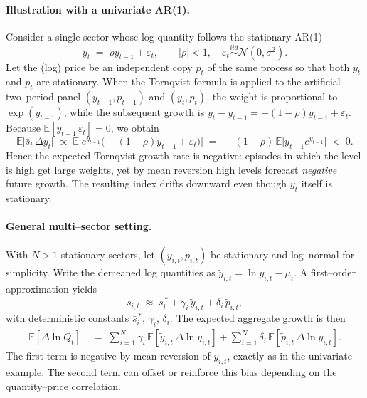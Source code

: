 \documentclass[12pt,english]{article}
\begin{document}
\paragraph{Illustration with a univariate AR(1).}
Consider a single sector whose log quantity follows the stationary AR(1)
\begin{equation*}
  y_t \;=\; \rho y_{t-1} + \varepsilon_t,\qquad |\rho|<1,\quad \varepsilon_t\stackrel{iid}{\sim}\mathcal{N}(0,\sigma^2).
\end{equation*}
Let the (log) price be an independent copy $p_t$ of the same process so
that both $y_t$ and $p_t$ are stationary.  When the Tornqvist formula is
applied to the artificial two--period panel $(y_{t-1},p_{t-1})$ and
$(y_t,p_t)$, the weight is proportional to $\exp(y_{t-1})$, while the
subsequent growth is $y_t-y_{t-1}=-(1-\rho)y_{t-1}+\varepsilon_t$.
Because $\mathbb{E}[y_{t-1}\,\varepsilon_t]=0$, we obtain
\begin{equation*}
  \mathbb{E}\bigl[\bar{s}_{t}\,\Delta y_t\bigr]
  \;\propto\; \mathbb{E}\bigl[ e^{y_{t-1}}
    \bigl(-(1-\rho)y_{t-1}+\varepsilon_t\bigr)\bigr]
  \;=\; -(1-\rho)\,\mathbb{E}\bigl[y_{t-1}e^{y_{t-1}}\bigr] \;<\;0.
\end{equation*}
Hence the expected Tornqvist growth rate is 
negative: episodes in which the level is high get large weights, yet by
mean reversion high levels forecast \emph{negative} future growth.  The
resulting index drifts downward even though $y_t$ itself is stationary.

\paragraph{General multi--sector setting.}
With $N>1$ stationary sectors, let $(y_{i,t},p_{i,t})$ be stationary and
log--normal for simplicity.  Write the demeaned log quantities as
$\tilde{y}_{i,t}=\ln y_{i,t}-\mu_i$.  A first--order approximation yields
\[\bar{s}_{i,t} \;\approx\; \bar{s}_i^{\,*} + \gamma_i\,\tilde{y}_{i,t}
   + \delta_i\,\tilde{p}_{i,t},\]
with deterministic constants $\bar{s}_i^{\,*}$, $\gamma_i$, $\delta_i$.
The expected aggregate growth is then
\begin{align*}
  \mathbb{E}[\Delta\ln Q_t]
  &\;=\; \sum_{i=1}^N \gamma_i\,\mathbb{E}[\tilde{y}_{i,t}\,\Delta\ln y_{i,t}]
   + \sum_{i=1}^N \delta_i\,\mathbb{E}[\tilde{p}_{i,t}\,\Delta\ln y_{i,t}].
\end{align*}
The first term is negative by mean reversion of $y_{i,t}$, exactly as in
the univariate example.  The second term can offset or reinforce this
bias depending on the quantity–price correlation.
\end{document}

